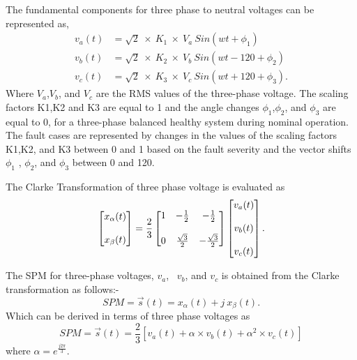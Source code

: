 The fundamental components for three phase to neutral voltages can be represented as,
\begin{align}
v_{a}{(t)}&=\sqrt{2}~\times~ K_{1}~\times~V_{a}~Sin(wt+\phi_{1})\\
v_{b}{(t)}&=\sqrt{2}~\times~ K_{2}~\times~V_{b}~Sin(wt-120+\phi_{2})\\
v_{c}{(t)}&=\sqrt{2}~ \times~K_{3}~\times~V_{c}~Sin(wt+120+\phi_{3}) .
\end{align}
Where $V_{a}$,$V_{b}$, and $V_{c}$ are the RMS values of the three-phase voltage. The scaling factors K1,K2 and K3 are equal to 1 and the angle changes $\phi_{1}$,$\phi_{2}$, and $\phi_{3} $ are equal to 0, for a three-phase balanced healthy system during nominal operation. The fault cases are represented by changes in the values of the scaling factors K1,K2, and K3 between 0 and 1 based on the fault severity and the vector shifts  $\phi_{1}$ , $ \phi_{2}$, and $\phi_{3}$  between 0 and 120.

The Clarke Transformation of three phase voltage is evaluated as 
\begin{equation}
\begin{bmatrix}
x_{\alpha}(t)\\\\
x_{\beta}(t)\\
\end{bmatrix}=\frac{2}{3}
\begin{bmatrix}
1&-\frac{1}{2}&-\frac{1}{2}\\\\
0&\frac{\sqrt{3}}{2}&-\frac{\sqrt{3}}{2}\\
\end{bmatrix}
\begin{bmatrix}
v_{a}(t)\\\\
v_{b}(t)\\\\
v_{c}(t)\\
\end{bmatrix}.\\
\end{equation}

The SPM for three-phase voltages, $v_{a}$,~ $v_{b}$, and $v_{c}$ is obtained from the Clarke transformation as follows:-
\begin{equation}
SPM =  \vec{s}(t) = x_{\alpha}(t) + j~x_{\beta}(t).
\end{equation}
Which can be derived in terms of three phase voltages as
\begin{equation}\label{spmequation}
SPM = \vec{s}(t) =\frac{2}{3}[v_{a}{(t)}+\alpha \times  v_{b}{(t)}+\alpha^{2} \times v_{c}{(t)}]
\end{equation}
where $\alpha = e^\frac{j2\pi}{3}$.


